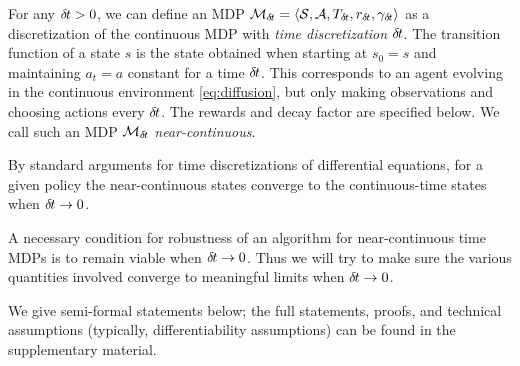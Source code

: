 For any ${\delta\hspace{-.1em}t}>0$, we can define an MDP ${\cal
M}_{\delta\hspace{-.1em}t} = \langle {\cal S}, {\cal A}, T_{{\delta\hspace{-.1em}t}}, r_{\delta\hspace{-.1em}t},
      \gamma_{\delta\hspace{-.1em}t}\rangle$ as a discretization of the continuous MDP with
      \emph{time discretization} ${\delta\hspace{-.1em}t}$. The %
      transition function of a state $s$
      is %
      the
      state obtained
      when starting at $s_0 = s$ and maintaining $a_t=a$ constant for a time
      ${\delta\hspace{-.1em}t}$.
      This corresponds to an agent evolving in the continuous
      environment \eqref{eq:diffusion}, but 
      only making observations and choosing actions every ${\delta\hspace{-.1em}t}$. The
      rewards and decay factor are specified below. We
      call such an  MDP ${\cal M}_{\delta\hspace{-.1em}t}$
      \emph{near-continuous}.      %


By standard arguments for time discretizations of differential
equations, for a given policy the near-continuous states converge to the
continuous-time states when ${\delta\hspace{-.1em}t}\to 0$. %

A necessary condition for robustness of an algorithm for
near-continuous time MDPs is 
to remain viable when ${\delta\hspace{-.1em}t} \rightarrow 0$. Thus we will try to
make sure the various quantities involved converge to meaningful
limits when ${\delta\hspace{-.1em}t}\to 0$. 

We give semi-formal statements below; the full statements, proofs, and
technical assumptions (typically, differentiability assumptions)
can be found in the supplementary material.

% 
      

